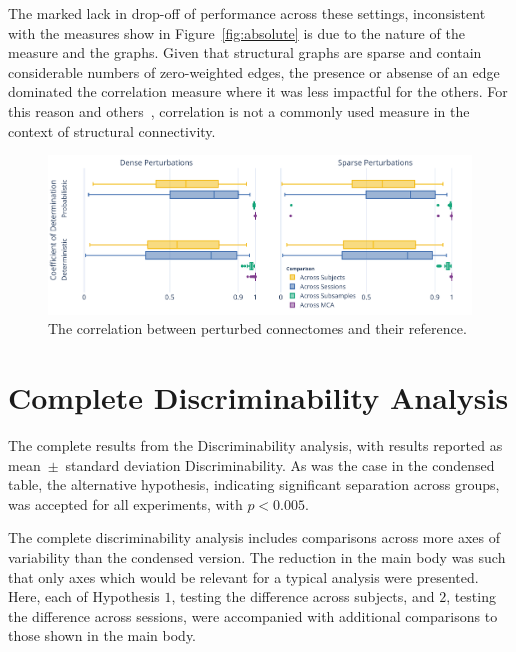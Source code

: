 \documentclass[fleqn,10pt]{SelfArx} %
\begin{document}
The marked lack in drop-off of performance across these settings, inconsistent with the measures show in
Figure~\ref{fig:absolute} is due to the nature of the measure and the graphs. Given that structural graphs are sparse
and contain considerable numbers of zero-weighted edges, the presence or absense of an edge dominated the correlation
measure where it was less impactful for the others. For this reason and others~\cite{huang2016linking}, correlation is
not a commonly used measure in the context of structural connectivity.

\begin{figure}[ht]\centering
\includegraphics[width=\linewidth]{figures/figS1_correlation_differences.pdf}
\caption{The correlation between perturbed connectomes and their reference.}
\label{fig:correlation}
\end{figure}

\clearpage
\section{Complete Discriminability Analysis}
\label{supsec:discrimfull}

\begin{table}[ht]\centering
\caption{The complete results from the Discriminability analysis, with results reported as mean~$\pm$~standard
deviation Discriminability. As was the case in the condensed table, the alternative hypothesis, indicating significant
separation across groups, was accepted for all experiments, with $p < 0.005$.}
\vspace{5pt}

\label{stab:discrim_full}
\end{table}

The complete discriminability analysis includes comparisons across more axes of variability than the condensed version.
The reduction in the main body was such that only axes which would be relevant for a typical analysis were presented.
Here, each of Hypothesis $1$, testing the difference across subjects, and $2$, testing the difference across sessions,
were accompanied with additional comparisons to those shown in the main body.
\end{document}
